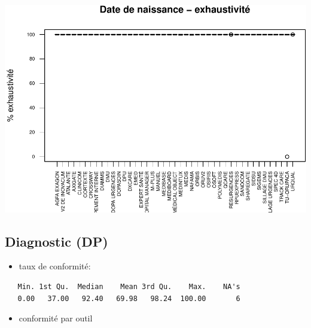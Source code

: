\documentclass[]{article}
\providecommand{\tightlist}{%
  \setlength{\itemsep}{0pt}\setlength{\parskip}{0pt}}
\begin{document}
\includegraphics{septembre2015_files/figure-latex/unnamed-chunk-16-1.pdf}

\subsection{Diagnostic (DP)}\label{diagnostic-dp}

\begin{itemize}
\tightlist
\item
  taux de conformité:
\end{itemize}

\begin{verbatim}
   Min. 1st Qu.  Median    Mean 3rd Qu.    Max.    NA's 
   0.00   37.00   92.40   69.98   98.24  100.00       6 
\end{verbatim}

\begin{itemize}
\tightlist
\item
  conformité par outil
\end{itemize}
\end{document}
